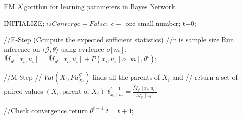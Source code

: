 \documentclass[letterpaper, 11pt]{article}
\begin{document}
\begin{algorithm}
\caption{EM Algorithm for learning parameters in Bayes Network}
\begin{algorithmic}[1]
 \State INITIALIZE;
 \State $isConverge = False;$
 \State $\epsilon = $ one small number;
 \State t=0;

    \State //E-Step (Compute the expected sufficient statistics)
     //n is sample size
        \State Run inference on $\langle \mathcal{G}, \theta \rangle$ using evidence $o[m]$;
                \State $\bar{M}_{\theta^{t}}[x_i, u_i] = \bar{M}_{\theta^t}[x_i, u_i] + P(x_i, u_i \mid o[m],\theta^t)$;
            \EndFor
        \EndFor
    
    \EndFor

    \State //M-Step
            \State // $Val(X_i, Pa_{X_i}^\mathcal{G})$ finds all the parents of $X_i$ and 
            \State // return a set of paired values $(X_i, \text{parent of } X_i)$
            \State $\theta_{x_i \mid u_i}^{t+1} = \frac{\bar{M}_{\theta^t}[x_i, u_i]}{\bar{M}_{\theta^t}[u_i]}$
        \EndFor
    \EndFor
    
    \State //Check convergence
        \State return $\theta^{t+1}$
    \EndIf
    \State $t = t + 1$;
\EndWhile
\EndProcedure
\end{algorithmic}
\end{algorithm}
\end{document}
